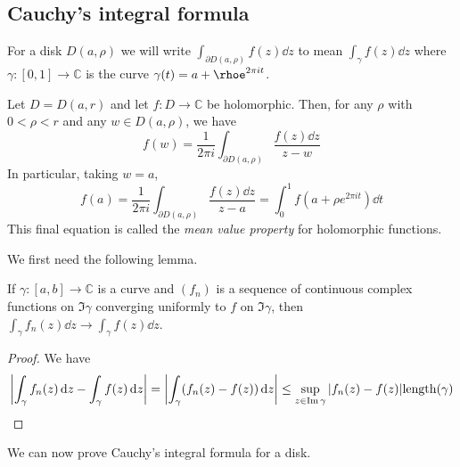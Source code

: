 \subsection{Cauchy's integral formula}
For a disk \( D(a,\rho) \) we will write \( \int_{\partial D(a,\rho)} f(z) \dd{z} \) to mean \( \int_\gamma f(z) \dd{z} \) where \( \gamma \colon [0,1] \to \mathbb C \) is the curve \( \gamma(t) = a+\rhoe^{2\pi i t} \).
\begin{theorem}
	Let \( D = D(a,r) \) and let \( f \colon D \to \mathbb C \) be holomorphic.
	Then, for any \( \rho \) with \( 0 < \rho < r \) and any \( w \in D(a,\rho) \), we have
	\[ f(w) = \frac{1}{2\pi i} \int_{\partial D(a,\rho)} \frac{f(z) \dd{z}}{z-w} \]
	In particular, taking \( w = a \),
	\[ f(a) = \frac{1}{2\pi i} \int_{\partial D(a,\rho)} \frac{f(z) \dd{z}}{z-a} = \int_0^1 f(a+\rho e^{2\pi i t}) \dd{t} \]
	This final equation is called the \textit{mean value property} for holomorphic functions.
\end{theorem}
We first need the following lemma.
\begin{lemma}
	If \( \gamma \colon [a,b] \to \mathbb C \) is a curve and \( (f_n) \) is a sequence of continuous complex functions on \( \Im \gamma \) converging uniformly to \( f \) on \( \Im\gamma \), then \( \int_\gamma f_n(z) \dd{z} \to \int_\gamma f(z) \dd{z} \).
\end{lemma}
\begin{proof}
	We have
	\[ \abs{\int_\gamma f_n(z) \dd{z} - \int_\gamma f(z) \dd{z}} = \abs{\int_\gamma (f_n(z) - f(z)) \dd{z}} \leq \sup_{z \in \Im \gamma} \abs{f_n(z) - f(z)} \mathrm{length}(\gamma) \]
\end{proof}
We can now prove Cauchy's integral formula for a disk.
